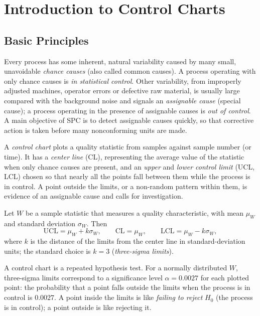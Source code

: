 \section{Introduction to Control Charts}

\subsection{Basic Principles}

Every process has some inherent, natural variability caused by many small, unavoidable \emph{chance causes} (also called common causes). A process operating with only chance causes is \emph{in statistical control}. Other variability, from improperly adjusted machines, operator errors or defective raw material, is usually large compared with the background noise and signals an \emph{assignable cause} (special cause); a process operating in the presence of assignable causes is \emph{out of control}. A main objective of SPC is to detect assignable causes quickly, so that corrective action is taken before many nonconforming units are made.

A \emph{control chart} plots a quality statistic from samples against sample number (or time). It has a \emph{center line} (CL), representing the average value of the statistic when only chance causes are present, and an \emph{upper} and \emph{lower control limit} (UCL, LCL) chosen so that nearly all the points fall between them while the process is in control. A point outside the limits, or a non-random pattern within them, is evidence of an assignable cause and calls for investigation.

\begin{definition}
Let $W$ be a sample statistic that measures a quality characteristic, with mean $\mu_W$ and standard deviation $\sigma_W$. Then
\[ \mathrm{UCL}=\mu_W+k\sigma_W,\qquad\mathrm{CL}=\mu_W,\qquad\mathrm{LCL}=\mu_W-k\sigma_W, \]
where $k$ is the distance of the limits from the center line in standard-deviation units; the standard choice is $k=3$ (\emph{three-sigma limits}).
\end{definition}

A control chart is a repeated hypothesis test. For a normally distributed $W$, three-sigma limits correspond to a significance level $\alpha=0.0027$ for each plotted point: the probability that a point falls outside the limits when the process is in control is $0.0027$. A point inside the limits is like \emph{failing to reject} $H_0$ (the process is in control); a point outside is like rejecting it.

